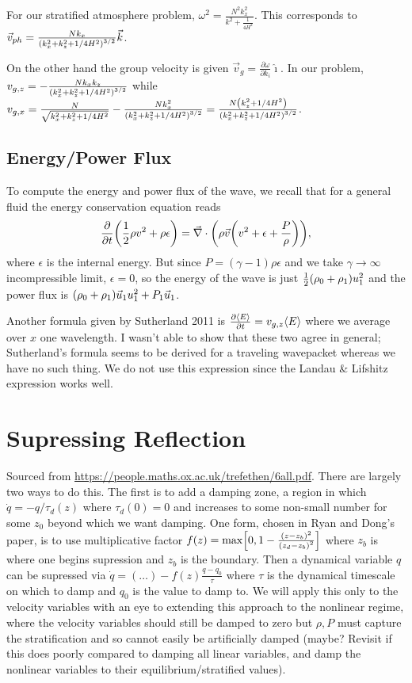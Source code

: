 \documentclass[11pt,
        usenames, %
        dvipsnames %
    ]{report}
\newcommand*{\pd}[2]{\frac{\partial#1}{\partial#2}}
\DeclarePairedDelimiter\ev{\langle}{\rangle}
\DeclarePairedDelimiter\p{\lparen}{\rparen}
\DeclarePairedDelimiter\s{\lbrack}{\rbrack}
\begin{document}
For our stratified atmosphere problem, $\omega^2 = \frac{N^2 k_x^2}{k^2 +
\frac{1}{4H^2}}$. This corresponds to $\vec{v}_{ph} = \frac{Nk_x}{\p*{k_x^2 +
k_z^2 + 1/4H^2}^{3/2}} \vec{k}$.

On the other hand the group velocity is given $\vec{v}_g =
\pd{\omega}{k_i}\hat{\imath}$. In our problem, $v_{g, z} =
-\frac{Nk_xk_z}{\p*{k_x^2 + k_z^2 + 1/4H^2}^{3/2}}$ while $v_{g, x} =
\frac{N}{\sqrt{k_x^2 + k_z^2 + 1/4H^2}} - \frac{Nk_x^2}{\p*{k_x^2 +
k_z^2 + 1/4H^2}^{3/2}} = \frac{N\p*{k_z^2 + 1/4H^2}}{\p*{k_x^2 +
k_z^2 + 1/4H^2}^{3/2}}$.

\subsection{Energy/Power Flux}

To compute the energy and power flux of the wave, we recall that for a general
fluid the energy conservation equation reads
\begin{equation}
    \pd{}{t}\p*{\frac{1}{2}\rho v^2 + \rho \epsilon}
        = \vec{\nabla} \cdot \p*{
            \rho \vec{v}\p*{v^2 + \epsilon + \frac{P}{\rho}}
        },
\end{equation}
where $\epsilon$ is the internal energy. But since $P = (\gamma -
1)\rho\epsilon$ and we take $\gamma \to \infty$ incompressible limit, $\epsilon
= 0$, so the energy of the wave is just $\frac{1}{2}\p*{\rho_0 + \rho_1} u_1^2$
and the power flux is $\p*{\rho_0 + \rho_1}\vec{u}_1u_1^2 + P_1\vec{u}_1$.

Another formula given by Sutherland 2011 is $\pd{\ev*{E}}{t} = v_{g, z}
\ev*{E}$ where we average over $x$ one wavelength. I wasn't able to show
that these two agree in general; Sutherland's formula seems to be derived for a
traveling wavepacket whereas we have no such thing. We do not use this
expression since the Landau \& Lifshitz expression works well.

\section{Supressing Reflection}

Sourced from \url{https://people.maths.ox.ac.uk/trefethen/6all.pdf}. There are
largely two ways to do this. The first is to add a damping zone, a region in
which $\dot{q} = -q/\tau_d(z)$ where $\tau_d(0) = 0$ and increases to some
non-small number for some $z_0$ beyond which we want damping. One form, chosen
in Ryan and Dong's paper, is to use multiplicative factor $f(z) = \max\s*{0, 1 -
\frac{\p*{z - z_b}^2}{\p*{z_d - z_b}^2}}$ where $z_b$ is where one begins
supression and $z_b$ is the boundary. Then a dynamical variable $q$ can be
supressed via $\dot{q} = (\dots) - f(z)\frac{q - q_0}{\tau}$ where $\tau$ is the
dynamical timescale on which to damp and $q_0$ is the value to damp to. We will
apply this only to the velocity variables with an eye to extending this approach
to the nonlinear regime, where the velocity variables should still be damped to
zero but $\rho, P$ must capture the stratification and so cannot easily be
artificially damped (maybe? Revisit if this does poorly compared to damping all
linear variables, and damp the nonlinear variables to their
equilibrium/stratified values).
\end{document}
